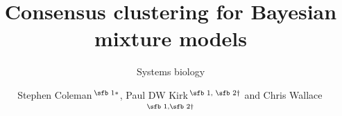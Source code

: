 \documentclass{bioinfo}
\begin{document}

\subtitle{Systems biology}

\title[Consensus clustering for Bayesian mixture models]{Consensus clustering for Bayesian mixture models}
\author[Coleman \textit{et~al}.]{Stephen Coleman\,$^{\text{\sfb 1}*}$, Paul DW Kirk\,$^{\text{\sfb 1, \sfb 2}\dagger}$ and Chris Wallace\,$^{\text{\sfb 1,\sfb 2}\dagger}$}
\address{$^{\text{\sf 1}}$MRC Biostatistics Unit, University of Cambridge, Cambridge, CB2 0SR, United Kingdom and \\
$^{\text{\sf 2}}$Department of Medicine, University of Cambridge, Cambridge, CB2 0AW, United Kingdom.}




\end{document}
